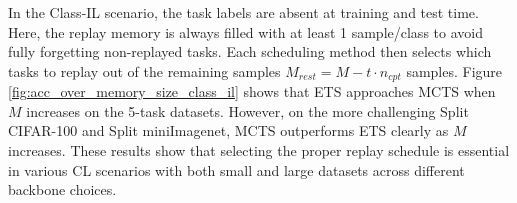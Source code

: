 In the Class-IL scenario, the task labels are absent at training and test time. Here, the replay memory is always filled with at least 1 sample/class to avoid fully forgetting non-replayed tasks. Each scheduling method then selects which tasks to replay out of the remaining samples $M_{rest} = M - t \cdot n_{cpt}$ samples. 
Figure \ref{fig:acc_over_memory_size_class_il} shows that ETS approaches MCTS when $M$ increases on the 5-task datasets. However, on the more challenging Split CIFAR-100 and Split miniImagenet, MCTS outperforms ETS clearly as $M$ increases. These results show that selecting the proper replay schedule is essential in various CL scenarios with both small and large datasets across different backbone choices.




%
\begin{table}[t]
	\centering
	\caption{
    Performance comparison with ACC between scheduling methods MCTS (Ours), Random, ETS, and Heuristic combined with replay-based methods HAL, MER, and DER. %
	Replay memory sizes are $M=10$ and $M=100$ for the 5-task and 10/20-task datasets respectively. We report the mean and standard deviation averaged over 5 seeds. Results on Heuristic where some seed did not converge is denoted by $^{*}$. Applying MCTS to each method can enhance the performance compared to using the baseline schedules. 
	}
	\vspace{-3mm}
	\resizebox{0.98\textwidth}{!}{ %
			
		}
		\vspace{-3mm}
		\label{tab:results_applying_scheduling_to_recent_replay_methods}
	\end{table}


